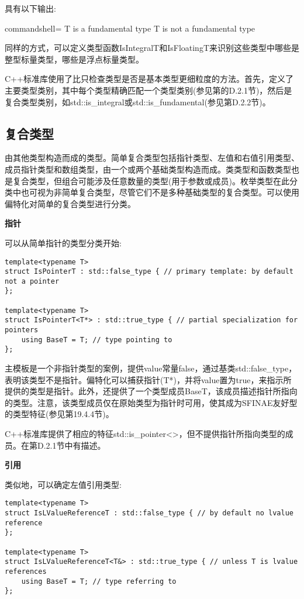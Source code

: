 具有以下输出:

\begin{tcblisting}{commandshell={}}
T is a fundamental type
T is not a fundamental type
\end{tcblisting}

同样的方式，可以定义类型函数IsIntegralT和IsFloatingT来识别这些类型中哪些是整型标量类型，哪些是浮点标量类型。

C++标准库使用了比只检查类型是否是基本类型更细粒度的方法。首先，定义了主要类型类别，其中每个类型精确匹配一个类型类别(参见第的D.2.1节)，然后是复合类型类别，如std::is\_integral或std::is\_fundamental(参见第D.2.2节)。

\subsection{复合类型}

由其他类型构造而成的类型。简单复合类型包括指针类型、左值和右值引用类型、成员指针类型和数组类型，由一个或两个基础类型构造而成。类类型和函数类型也是复合类型，但组合可能涉及任意数量的类型(用于参数或成员)。枚举类型在此分类中也可视为非简单复合类型，尽管它们不是多种基础类型的复合类型。可以使用偏特化对简单的复合类型进行分类。

\noindent
\textbf{指针}

可以从简单指针的类型分类开始:

\begin{lstlisting}[style=styleCXX]
template<typename T>
struct IsPointerT : std::false_type { // primary template: by default not a pointer
};

template<typename T>
struct IsPointerT<T*> : std::true_type { // partial specialization for pointers
	using BaseT = T; // type pointing to
};
\end{lstlisting}

主模板是一个非指针类型的案例，提供value常量false，通过基类std::false\_type，表明该类型不是指针。偏特化可以捕获指针(T*)，并将value置为true，来指示所提供的类型是指针。此外，还提供了一个类型成员BaseT，该成员描述指针所指向的类型。注意，该类型成员仅在原始类型为指针时可用，使其成为SFINAE友好型的类型特征(参见第19.4.4节)。

C++标准库提供了相应的特征std::is\_pointer<>，但不提供指针所指向类型的成员。在第D.2.1节中有描述。

\noindent
\textbf{引用}

类似地，可以确定左值引用类型:

\begin{lstlisting}[style=styleCXX]
template<typename T>
struct IsLValueReferenceT : std::false_type { // by default no lvalue reference
};

template<typename T>
struct IsLValueReferenceT<T&> : std::true_type { // unless T is lvalue references
	using BaseT = T; // type referring to
};
\end{lstlisting}

